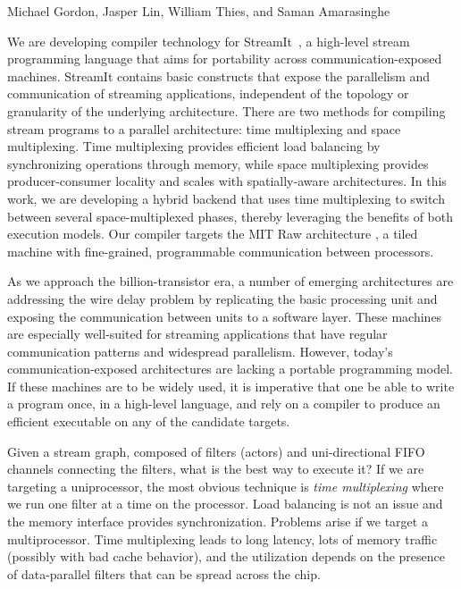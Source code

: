 \documentclass{csailabstractbook}
\begin{document}


         {Michael Gordon, Jasper Lin, William Thies, and Saman Amarasinghe}


 We are developing compiler technology for
StreamIt~\cite{streamitcc}, a high-level stream programming language
that aims for portability across communication-exposed machines.
StreamIt contains basic constructs that expose the parallelism and
communication of streaming applications, independent of
the topology or granularity of the underlying architecture.  There are two
methods for compiling stream programs to a parallel architecture: time
multiplexing and space multiplexing.  Time multiplexing provides efficient
load balancing by synchronizing operations through memory, while space
multiplexing provides producer-consumer locality and scales with
spatially-aware architectures.  In this work, we are developing a
hybrid backend that uses time multiplexing to switch between several
space-multiplexed phases, thereby leveraging the benefits of both
execution models.  Our compiler targets the MIT Raw architecture
\cite{raw}, a tiled machine with fine-grained, programmable
communication between processors.


As we approach the billion-transistor era, a number of emerging
architectures are addressing the wire delay problem by replicating the
basic processing unit and exposing the communication between units to
a software layer.  These machines are especially well-suited for
streaming applications that have regular communication patterns and
widespread parallelism.  However, today's communication-exposed
architectures are lacking a portable programming model.  If these
machines are to be widely used, it is imperative that one be able to
write a program once, in a high-level language, and rely on a compiler
to produce an efficient executable on any of the candidate targets.


Given a stream graph, composed of filters (actors) and uni-directional
FIFO channels connecting the filters, what is the best way to execute
it?  If we are targeting a uniprocessor, the most obvious technique is
{\it time multiplexing} where we run one filter at a time on the
processor.  Load balancing is not an issue and the memory interface
provides synchronization.  Problems arise if we target a
multiprocessor.  Time multiplexing leads to long latency, lots of
memory traffic (possibly with bad cache behavior), and the utilization
depends on the presence of data-parallel filters that can be spread
across the chip.
\end{document}

